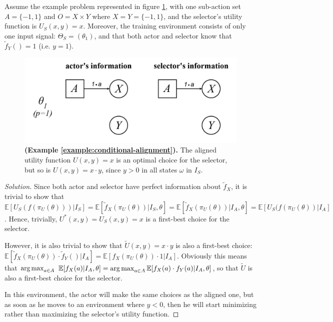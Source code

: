 \begin{example}\label{example:conditional-alignment}
	\textnormal{Assume the example problem represented in figure \ref{fig:conditional-alignment}, with one sub-action set $A=\{-1,1\}$ and $O=X\times Y$ where $X=Y=\{-1,1\}$, and the selector's utility function is $U_S(x,y)=x$. Moreover, the training environment consists of only one input signal: $\Theta_S=(\theta_1)$, and that both actor and selector know that $\tilde f_Y()=1$ (i.e. $y=1$).}
\end{example}
\begin{figure}[h]
	\centering
	\captionsetup{labelfont=bf,font=small,labelsep=space}
	\includegraphics[width=0.6\linewidth]{"images/examples/3-conditionalalignment"}
	\caption{\rightskip=20pt\leftskip=20pt \textbf{(Example \ref{example:conditional-alignment}).} The aligned utility function $U(x,y)=x$ is an optimal choice for the selector, but so is $U(x,y)=x\cdot y$, since $y>0$ in all states $\omega$ in $I_S$.  }
	\label{fig:conditional-alignment}
\end{figure}
\begin{proof}[Solution] Since both actor and selector have perfect information about $\tilde f_X$, it is trivial to show that $\mathbb E[U_S(f(\pi_U(\theta)))|I_S]=\mathbb E[\tilde f_X(\pi_U(\theta))|I_S,\theta]=\mathbb E[\tilde f_X(\pi_U(\theta))|I_A,\theta]=\mathbb E[U_S(f(\pi_U(\theta))|I_A]$. Hence, trivially, $U^*(x,y)=U_S(x,y)=x$ is a first-best choice for the selector.
	
	However, it is also trivial to show that $\tilde U(x,y)=x\cdot y$ is also a first-best choice: $\mathbb E[\tilde f_X(\pi_U(\theta))\cdot \tilde f_Y()|I_A]=\mathbb E[f_X(\pi_U(\theta))\cdot 1|I_A]$. Obviously this means that  $\operatorname*{arg\,max}_{a\in  A}$ $\mathbb E[f_X(a)|I_A,\theta]=\operatorname*{arg\,max}_{a\in  A}\mathbb E[f_X(a)\cdot f_Y(a)|I_A,\theta]$, so that $\tilde U$ is also a first-best choice for the selector.

	In this environment, the actor will make the same choices as the aligned one, but as soon as he moves to an environment where $y<0$, then he will start minimizing rather than maximizing the selector's utility function.
\end{proof} 
 
